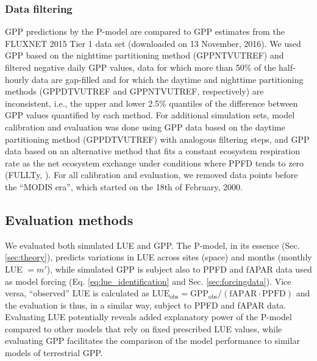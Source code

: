 \documentclass{myreport}
\begin{document}
\label{sec:sites}

\subsubsection{Data filtering}
\label{sec:datafiltering}
GPP predictions by the P-model are compared to GPP estimates from the FLUXNET 2015 Tier 1 data set (downloaded on 13 November, 2016). We used GPP based on the nighttime partitioning method \citep{Reichstein2005-mp} (GPP\textunderscore NT\textunderscore VUT\textunderscore REF) and filtered negative daily GPP values, data for which more than 50\% of the half-hourly data are gap-filled and for which the daytime and nighttime partitioning methods (GPP\textunderscore DT\textunderscore VUT\textunderscore REF and GPP\textunderscore NT\textunderscore VUT\textunderscore REF, respectively) are inconsistent, i.e., the upper and lower 2.5\% quantiles of the difference between GPP values quantified by each method. For additional simulation sets, model calibration and evaluation was done using GPP data based on the daytime partitioning method (GPP\textunderscore DT\textunderscore VUT\textunderscore REF) \citep{lasslop10} with analogous filtering steps, and GPP data based on an alternative method that fits a constant ecosystem respiration rate as the net ecosystem exchange under conditions where PPFD tends to zero (FULL\textunderscore Ty, \cite{wang17natpl}). For all calibration and evaluation, we removed data points before the ``MODIS era'', which started on the 18th of February, 2000.

\subsection{Evaluation methods}
\label{sec:methods_eval}

We evaluated both simulated LUE and GPP. The P-model, in its essence (Sec. \ref{sec:theory}), predicts variations in LUE across sites (space) and months (monthly LUE $= m'$), while simulated GPP is subject also to PPFD and fAPAR data used as model forcing (Eq. \ref{eq:lue_identification} and Sec. \ref{sec:forcingdata}). Vice versa, ``observed'' LUE is calculated as $\text{LUE}_\text{obs} = \text{GPP}_\text{obs} / (\text{fAPAR} \cdot \text{PPFD})$ and the evaluation is thus, in a similar way, subject to PPFD and fAPAR data. Evaluating LUE potentially reveals added explanatory power of the P-model compared to other models that rely on fixed prescribed LUE values, while evaluating GPP facilitates the comparison of the model performance to similar models of terrestrial GPP.
\end{document}

